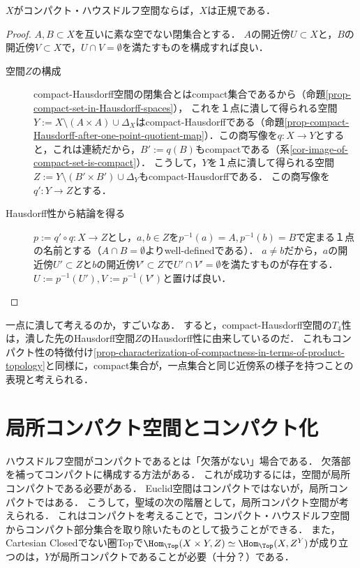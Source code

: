 \documentclass[uplatex,dvipdfmx]{jsreport}
\begin{document}
\begin{corollary}\label{cor-compact-Hausdorff-space-is-normal}
    $X$がコンパクト・ハウスドルフ空間ならば，$X$は正規である．
\end{corollary}
\begin{proof}
    $A,B\subset X$を互いに素な空でない閉集合とする．
    $A$の開近傍$U\subset X$と，$B$の開近傍$V\subset X$で，$U\cap V=\emptyset$を満たすものを構成すれば良い．
    \begin{description}
        \item[空間$Z$の構成] 
        compact-Hausdorff空間の閉集合とはcompact集合であるから（命題\ref{prop-compact-set-in-Hausdorff-spaces}），
        これを１点に潰して得られる空間$Y:=X\setminus(A\times A)\cup\Delta_X$はcompact-Hausdorffである（命題\ref{prop-compact-Hausdorff-after-one-point-quotient-map}）．この商写像を$q:X\to Y$とすると，これは連続だから，$B':=q(B)$もcompactである（系\ref{cor-image-of-compact-set-is-compact}）．
        こうして，$Y$を１点に潰して得られる空間$Z:=Y\setminus(B'\times B')\cup\Delta_Y$もcompact-Hausdorffである．
        この商写像を$q':Y\to Z$とする．
        \item[Hausdorff性から結論を得る]
        $p:=q'\circ q:X\to Z$とし，$a,b\in Z$を$p^{-1}(a)=A,p^{-1}(b)=B$で定まる１点の名前とする（$A\cap B=\emptyset$よりwell-definedである）．
        $a\ne b$だから，$a$の開近傍$U'\subset Z$と$b$の開近傍$V'\subset Z$で$U'\cap V'=\emptyset$を満たすものが存在する．
        $U:=p^{-1}(U'),V:=p^{-1}(V')$と置けば良い．
    \end{description}
\end{proof}
\begin{remarks}
    一点に潰して考えるのか，すごいなあ．
    すると，compact-Hausdorff空間の$T_4$性は，潰した先のHausdorff空間$Z$のHausdorff性に由来しているのだ．
    これもコンパクト性の特徴付け\ref{prop-characterization-of-compactness-in-terms-of-product-topology}と同様に，compact集合が，一点集合と同じ近傍系の様子を持つことの表現と考えられる．
\end{remarks}

\section{局所コンパクト空間とコンパクト化}

\begin{tcolorbox}[colframe=ForestGreen, colback=ForestGreen!10!white, breakable ,colbacktitle=ForestGreen!40!white, coltitle=black,fonttitle=\bfseries\sffamily,
    title=compact-Hausdorff空間という聖域の構成の試み]
    ハウスドルフ空間がコンパクトであるとは「欠落がない」場合である．
    欠落部を補ってコンパクトに構成する方法がある．
    これが成功するには，空間が局所コンパクトである必要がある．
    Euclid空間はコンパクトではないが，局所コンパクトではある．
    こうして，聖域の次の階層として，局所コンパクト空間が考えられる．
    これはコンパクトを考えることで，コンパクト・ハウスドルフ空間からコンパクト部分集合を取り除いたものとして扱うことができる．
    また，Cartesian Closedでない圏Topで$\Hom_\Top(X\times Y,Z)\simeq\Hom_\Top(X,Z^Y)$が成り立つのは，$Y$が局所コンパクトであることが必要（十分？）である．
\end{tcolorbox}
\end{document}
